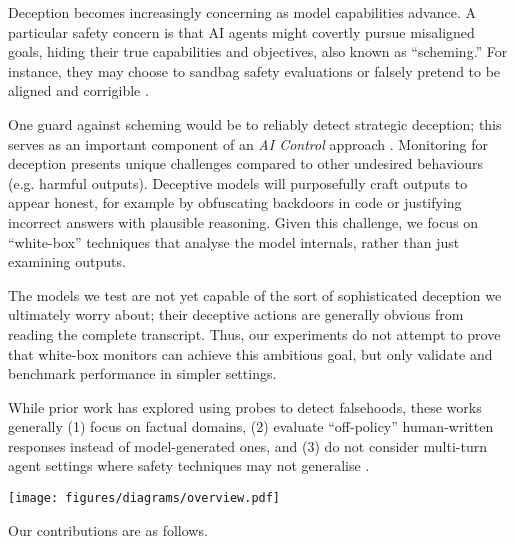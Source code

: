 \documentclass{article}
\begin{document}
Deception becomes increasingly concerning as model capabilities advance.
A particular safety concern is that AI agents might covertly pursue misaligned goals, hiding their true capabilities and objectives, also known as \enquote{scheming.}
For instance, they may choose to sandbag safety evaluations \citep{Weij2024_sandbagging} or falsely pretend to be aligned and corrigible \citep{Greenblatt2024_faking, Carlsmith2023_scheming}.

One guard against scheming would be to reliably detect strategic deception;
this serves as an important component of an \emph{AI Control} approach \citep{Greenblatt2023_control}.
Monitoring for deception presents unique challenges compared to other undesired behaviours (e.g. harmful outputs).
Deceptive models will purposefully craft outputs to appear honest,
for example by obfuscating backdoors in code or justifying incorrect answers with plausible reasoning.
Given this challenge, we focus on \enquote{white-box} techniques that analyse the model internals,
rather than just examining outputs.

The models we test are not yet capable of the sort of sophisticated deception we ultimately worry about;
their deceptive actions are generally obvious from reading the complete transcript. 
Thus, our experiments do not attempt to prove that white-box monitors can achieve this ambitious goal,
but only validate and benchmark performance in simpler settings.

While prior work \citep{Zou2023_repe, Burns2022_ccs, Marks2023_geometry} has explored using probes to detect falsehoods,
these works generally (1) focus on factual domains, (2) evaluate \enquote{off-policy} human-written responses instead of model-generated ones, and (3) do not consider multi-turn agent settings where safety techniques may not generalise \citep{Andriushchenko2024_agentharm, Lermen2024_refusal, Kumar2024_refusal}.

\begin{figure*}[t]
  \centering
  \texttt{[image: figures/diagrams/overview.pdf]}
  \caption{
    Overview of our probing methodology.
    We gather activations on contrastive pairs similar to the example on the left, and fit a probe using logistic regression.
    We use this probe to detect deception on evaluation datasets where Llama sometimes gives deceptive responses.
  }
  \label{fig:overview}
\end{figure*}

Our contributions are as follows.
\end{document}
